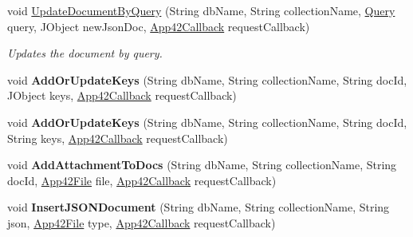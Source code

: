 \begin{DoxyCompactItemize}
void \hyperlink{classcom_1_1shephertz_1_1app42_1_1paas_1_1sdk_1_1windows_1_1storage_1_1_storage_service_a4f5f3c721273e27316cd4c0df6a9dd1c}{Update\+Document\+By\+Query} (String db\+Name, String collection\+Name, \hyperlink{classcom_1_1shephertz_1_1app42_1_1paas_1_1sdk_1_1windows_1_1storage_1_1_query}{Query} query, J\+Object new\+Json\+Doc, \hyperlink{interfacecom_1_1shephertz_1_1app42_1_1paas_1_1sdk_1_1windows_1_1_app42_callback}{App42\+Callback} request\+Callback)
\begin{DoxyCompactList}\small\item\em Updates the document by query. \end{DoxyCompactList}\item 
\hypertarget{classcom_1_1shephertz_1_1app42_1_1paas_1_1sdk_1_1windows_1_1storage_1_1_storage_service_a57385614d3fee9365d6de9cfbeffef1d}{void {\bfseries Add\+Or\+Update\+Keys} (String db\+Name, String collection\+Name, String doc\+Id, J\+Object keys, \hyperlink{interfacecom_1_1shephertz_1_1app42_1_1paas_1_1sdk_1_1windows_1_1_app42_callback}{App42\+Callback} request\+Callback)}\label{classcom_1_1shephertz_1_1app42_1_1paas_1_1sdk_1_1windows_1_1storage_1_1_storage_service_a57385614d3fee9365d6de9cfbeffef1d}

\item 
\hypertarget{classcom_1_1shephertz_1_1app42_1_1paas_1_1sdk_1_1windows_1_1storage_1_1_storage_service_a40da0e8b9bdd700247894fd5f9f5c640}{void {\bfseries Add\+Or\+Update\+Keys} (String db\+Name, String collection\+Name, String doc\+Id, String keys, \hyperlink{interfacecom_1_1shephertz_1_1app42_1_1paas_1_1sdk_1_1windows_1_1_app42_callback}{App42\+Callback} request\+Callback)}\label{classcom_1_1shephertz_1_1app42_1_1paas_1_1sdk_1_1windows_1_1storage_1_1_storage_service_a40da0e8b9bdd700247894fd5f9f5c640}

\item 
\hypertarget{classcom_1_1shephertz_1_1app42_1_1paas_1_1sdk_1_1windows_1_1storage_1_1_storage_service_a55a4eaddcce4f6781cb22659bca75cf5}{void {\bfseries Add\+Attachment\+To\+Docs} (String db\+Name, String collection\+Name, String doc\+Id, \hyperlink{classcom_1_1shephertz_1_1app42_1_1paas_1_1sdk_1_1windows_1_1_app42_file}{App42\+File} file, \hyperlink{interfacecom_1_1shephertz_1_1app42_1_1paas_1_1sdk_1_1windows_1_1_app42_callback}{App42\+Callback} request\+Callback)}\label{classcom_1_1shephertz_1_1app42_1_1paas_1_1sdk_1_1windows_1_1storage_1_1_storage_service_a55a4eaddcce4f6781cb22659bca75cf5}

\item 
\hypertarget{classcom_1_1shephertz_1_1app42_1_1paas_1_1sdk_1_1windows_1_1storage_1_1_storage_service_a601535641db1b1f0c85c6785d70aced8}{void {\bfseries Insert\+J\+S\+O\+N\+Document} (String db\+Name, String collection\+Name, String json, \hyperlink{classcom_1_1shephertz_1_1app42_1_1paas_1_1sdk_1_1windows_1_1_app42_file}{App42\+File} type, \hyperlink{interfacecom_1_1shephertz_1_1app42_1_1paas_1_1sdk_1_1windows_1_1_app42_callback}{App42\+Callback} request\+Callback)}\label{classcom_1_1shephertz_1_1app42_1_1paas_1_1sdk_1_1windows_1_1storage_1_1_storage_service_a601535641db1b1f0c85c6785d70aced8}


\end{DoxyCompactItemize}
